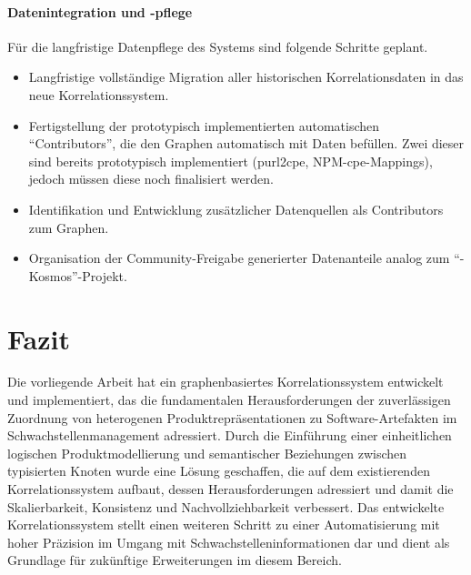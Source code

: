 \paragraph{Datenintegration und -pflege}

Für die langfristige Datenpflege des Systems sind folgende Schritte geplant.

\begin{itemize}
    \itemsep0em
    \item Langfristige vollständige Migration aller historischen Korrelationsdaten in das neue Korrelationssystem.
    \item Fertigstellung der prototypisch implementierten automatischen \enquote{Contributors}, die den Graphen automatisch mit Daten befüllen.
    Zwei dieser sind bereits prototypisch implementiert (purl2cpe, NPM-\acrshort{cpe}-Mappings), jedoch müssen diese noch finalisiert werden.
    \item Identifikation und Entwicklung zusätzlicher Datenquellen als Contributors zum Graphen.
    \item Organisation der Community-Freigabe generierter Datenanteile analog zum \enquote{\metaeffekt-Kosmos}-Projekt.
\end{itemize}


\section{Fazit}

Die vorliegende Arbeit hat ein graphenbasiertes Korrelationssystem entwickelt und implementiert, das die fundamentalen Herausforderungen der zuverlässigen Zuordnung von heterogenen Produktrepräsentationen zu Software-Artefakten im Schwachstellenmanagement adressiert.
Durch die Einführung einer einheitlichen logischen Produktmodellierung und semantischer Beziehungen zwischen typisierten Knoten wurde eine Lösung geschaffen, die auf dem existierenden Korrelationssystem aufbaut, dessen Herausforderungen adressiert und damit die Skalierbarkeit, Konsistenz und Nachvollziehbarkeit verbessert.
Das entwickelte Korrelationssystem stellt einen weiteren Schritt zu einer Automatisierung mit hoher Präzision im Umgang mit Schwachstelleninformationen dar und dient als Grundlage für zukünftige Erweiterungen im diesem Bereich.

